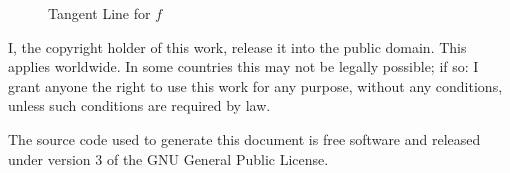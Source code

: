 \documentclass{article}
\theoremstyle{normal}
\begin{document}
    \begin{figure}
        \centering
        \caption{Tangent Line for $f$}
        \label{fig:tan_line}
    \end{figure}
    \newpage
    I, the copyright holder of this work, release it into the public domain.
    This applies worldwide. In some countries this may not be legally possible;
    if so: I grant anyone the right to use this work for any purpose, without
    any conditions, unless such conditions are required by law.
    \par\hfill\par
    The source code used to generate this document is free software and released
    under version 3 of the GNU General Public License.
\end{document}
